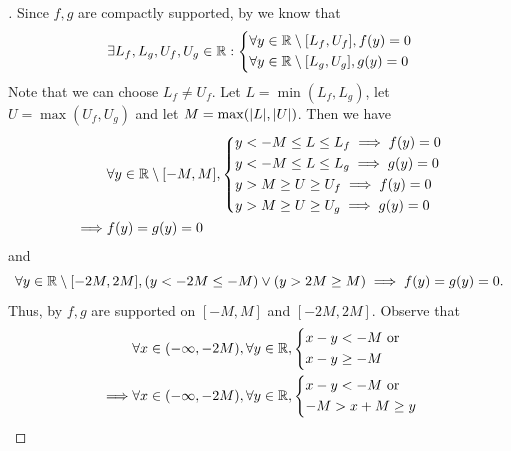 \begin{proof}[]
  Since \(f, g\) are compactly supported, by  we know that
  \[
    \exists L_f, L_g, U_f, U_g \in \mathbb{R} : \begin{dcases}
      \forall y \in \mathbb{R} \setminus [L_f, U_f], f(y) = 0 \\
      \forall y \in \mathbb{R} \setminus [L_g, U_g], g(y) = 0
    \end{dcases}
  \]
  Note that we can choose \(L_f \neq U_f\).
  Let \(L = \min(L_f, L_g)\), let \(U = \max(U_f, U_g)\) and let \(M = \max(\abs{L}, \abs{U})\).
  Then we have
  \begin{align*}
             & \forall y \in \mathbb{R} \setminus [-M, M], \begin{dcases}
                                                     y < -M \leq L \leq L_f \implies f(y) = 0 \\
                                                     y < -M \leq L \leq L_g \implies g(y) = 0 \\
                                                     y > M \geq U \geq U_f \implies f(y) = 0  \\
                                                     y > M \geq U \geq U_g \implies g(y) = 0
                                                   \end{dcases} \\
    \implies & f(y) = g(y) = 0
  \end{align*}
  and
  \[
    \forall y \in \mathbb{R} \setminus [-2M, 2M], (y < -2M \leq -M) \lor (y > 2M \geq M) \implies f(y) = g(y) = 0.
  \]
  Thus, by  \(f, g\) are supported on \([-M, M]\) and \([-2M, 2M]\).
  Observe that
  \begin{align*}
             & \forall x \in (-\infty, -2M), \forall y \in \R, \begin{dcases}
                                                                 x - y < -M \text{ or } \\
                                                                 x - y \geq -M
                                                               \end{dcases}                      \\
    \implies & \forall x \in (-\infty, -2M), \forall y \in \R, \begin{dcases}
                                                                 x - y < -M \text{ or } \\
                                                                 -M > x + M \geq y

\end{dcases}
\end{align*}
\end{proof}
